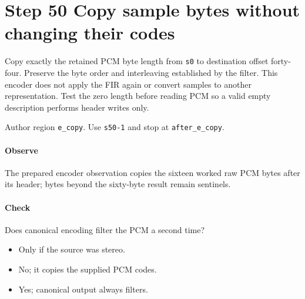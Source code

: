 \section{Step 50 Copy sample bytes without changing their codes}\label{pcm-wav-s50}
Copy exactly the retained PCM byte length from \texttt{s0} to destination offset forty-four. Preserve the byte order and interleaving established by the filter. This encoder does not apply the FIR again or convert samples to another representation. Test the zero length before reading PCM so a valid empty description performs header writes only.

Author region \texttt{e\_copy}. Use \texttt{s50-1} and stop at \texttt{after\_e\_copy}.

\paragraph{Observe} The prepared encoder observation copies the sixteen worked raw PCM bytes after its header; bytes beyond the sixty-byte result remain sentinels.

\paragraph{Check} Does canonical encoding filter the PCM a second time?
\begin{itemize}
\item[A.] Only if the source was stereo.
\item[B.] No; it copies the supplied PCM codes.
\item[C.] Yes; canonical output always filters.
\end{itemize}
